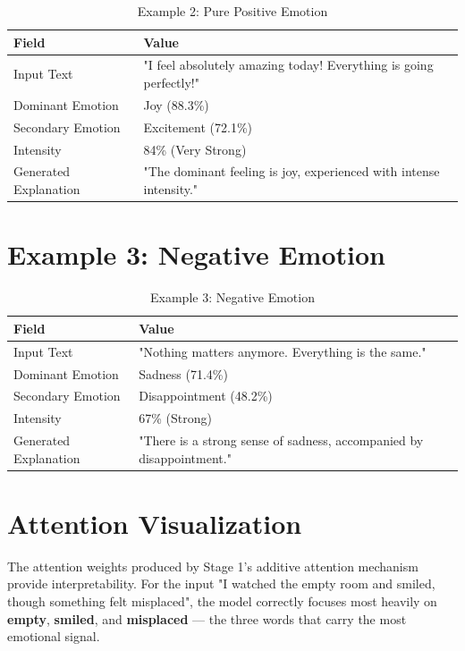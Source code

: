 \documentclass[12pt, a4paper]{report}
\begin{document}
\begin{table}[H]
    \centering
    \caption{Example 2: Pure Positive Emotion}
    \label{tab:example2}
    \begin{tabular}{@{}ll@{}}
        \toprule
        \textbf{Field} & \textbf{Value} \\
        \midrule
        Input Text & "I feel absolutely amazing today! Everything is going perfectly!" \\
        Dominant Emotion & Joy (88.3\%) \\
        Secondary Emotion & Excitement (72.1\%) \\
        Intensity & 84\% (Very Strong) \\
        Generated Explanation & "The dominant feeling is joy, experienced with intense intensity." \\
        \bottomrule
    \end{tabular}
\end{table}

\section{Example 3: Negative Emotion}

\begin{table}[H]
    \centering
    \caption{Example 3: Negative Emotion}
    \label{tab:example3}
    \begin{tabular}{@{}ll@{}}
        \toprule
        \textbf{Field} & \textbf{Value} \\
        \midrule
        Input Text & "Nothing matters anymore. Everything is the same." \\
        Dominant Emotion & Sadness (71.4\%) \\
        Secondary Emotion & Disappointment (48.2\%) \\
        Intensity & 67\% (Strong) \\
        Generated Explanation & "There is a strong sense of sadness, accompanied by disappointment." \\
        \bottomrule
    \end{tabular}
\end{table}

\section{Attention Visualization}

The attention weights produced by Stage 1's additive attention mechanism provide interpretability. For the input "I watched the empty room and smiled, though something felt misplaced", the model correctly focuses most heavily on \textbf{empty}, \textbf{smiled}, and \textbf{misplaced} — the three words that carry the most emotional signal.
\end{document}
